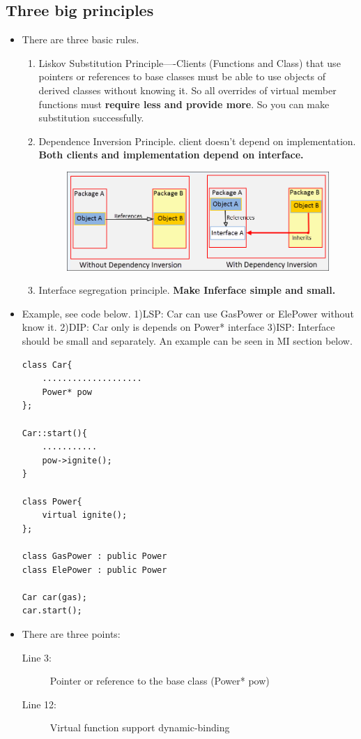 \documentclass[a4paper,11pt,twoside]{book}
\begin{document}
\subsection{Three big principles}
\begin{itemize}
	\item There are three basic rules.
\begin{enumerate}
	\item Liskov Substitution Principle----Clients (Functions and Class) that use pointers or references to base classes must be able to use objects of derived classes without knowing it.  So all overrides of virtual member functions must \textbf{require less and provide more}. So you can make substitution successfully.
	
	\item Dependence Inversion Principle. client doesn't depend on implementation. \textbf{Both clients and implementation depend on interface.}
	\begin{figure}[h]
		\centering
		\includegraphics[width=0.7\linewidth]{pics/DIP.png}
		\caption{}
		\label{fig:dip}
	\end{figure}
	
	\item Interface segregation principle. \textbf{Make Inferface simple and small.}
\end{enumerate}

\item Example, see code below.  1)LSP: Car can use  GasPower or ElePower without know it. 2)DIP: Car only is depends on Power* interface 3)ISP: Interface should be small and separately. An example can be seen in MI section below.

\begin{lstlisting}
class Car{
	....................
	Power* pow
};

Car::start(){
	...........
	pow->ignite();
}

class Power{
	virtual ignite();
};

class GasPower : public Power
class ElePower : public Power

Car car(gas);
car.start();
\end{lstlisting}
\item There are three points:
\begin{description}
	\item[Line 3:] Pointer or reference to the base class (Power* pow)
	\item[Line 12:] Virtual function support dynamic-binding
\end{description}

\end{itemize}
\end{document}
